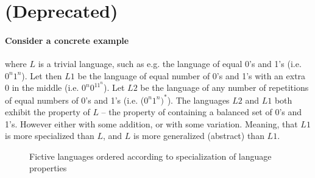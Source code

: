 \documentclass{scrreprt}
\begin{document}
\section{(Deprecated)}

\color{red}


\paragraph{Consider a concrete example} where $L$ is a trivial language, such as e.g. the language of equal 0's and 1's (i.e. $0^n1^n$). Let then $L1$ be the language of equal number of 0's and 1's with an extra 0 in the middle (i.e. $0^n0^11^n$). Let $L2$ be the language of any number of repetitions of equal numbers of 0's and 1's (i.e. ($0^n1^n)^*$). The languages $L2$ and $L1$ both exhibit the property of $L$ -- the property of containing a balanced set of 0's and 1's. However either with some addition, or with some variation. Meaning, that $L1$ is more specialized than $L$, and $L$ is more generalized (abstract) than $L1$.





\begin{figure}[h]
  \centering

  \caption{Fictive languages ordered according to specialization of language properties}
  \label{fig:fictive-specialization-tree}
\end{figure}
\end{document}
